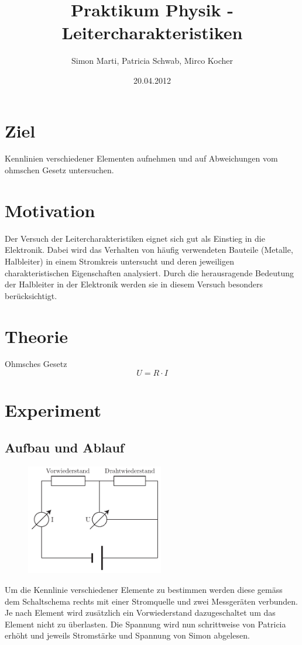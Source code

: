 \documentclass[12pt,a4paper]{article}
\title{Praktikum Physik - Leitercharakteristiken}
\author{Simon Marti, Patricia Schwab, Mirco Kocher}
\date{20.04.2012}
\begin{document}
\maketitle

\section*{Ziel}
Kennlinien verschiedener Elementen aufnehmen und auf Abweichungen vom ohmschen Gesetz untersuchen.

\section*{Motivation}
Der Versuch der Leitercharakteristiken eignet sich gut als Einstieg in die Elektronik. Dabei wird das Verhalten von h\"aufig verwendeten Bauteile (Metalle, Halbleiter) in einem Stromkreis untersucht und deren jeweiligen charakteristischen Eigenschaften analysiert. Durch die herausragende Bedeutung der Halbleiter in der Elektronik werden sie in diesem Versuch besonders ber\"ucksichtigt.

\section*{Theorie}
Ohmsches Gesetz
\begin{equation}
U=R\cdot I
\end{equation}

\section*{Experiment}

\subsection*{Aufbau und Ablauf}
\begin{figure}
\vspace{-15pt}
\centering
\includegraphics[width=6cm]{illustration.pdf}
\end{figure}
Um die Kennlinie verschiedener Elemente zu bestimmen werden diese gem\"ass dem Schaltschema rechts mit einer Stromquelle und zwei Messger\"aten verbunden. Je nach Element wird zus\"atzlich ein Vorwiederstand dazugeschaltet um das Element nicht zu \"uberlasten. Die Spannung wird nun schrittweise von Patricia erh\"oht und jeweils Stromst\"arke und Spannung von Simon abgelesen. 
\end{document}
